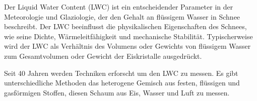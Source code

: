 Der Liquid Water Content (LWC) ist ein entscheidender Parameter in der Meteorologie und Glaziologie, der den Gehalt an flüssigem Wasser in Schnee beschreibt. Der LWC beeinflusst die physikalischen Eigenschaften des Schnees, wie seine Dichte, Wärmeleitfähigkeit und mechanische Stabilität. Typischerweise wird der LWC als Verhältnis des Volumens oder Gewichts von flüssigem Wasser zum Gesamtvolumen oder Gewicht der Eiskristalle ausgedrückt.

Seit 40 Jahren werden Techniken erforscht um den LWC zu messen. Es gibt unterschiedliche Methoden das heterogene Gemisch aus festen, flüssigen und gasförmigen Stoffen, diesen Schaum aus Eis, Wasser und Luft zu messen.
